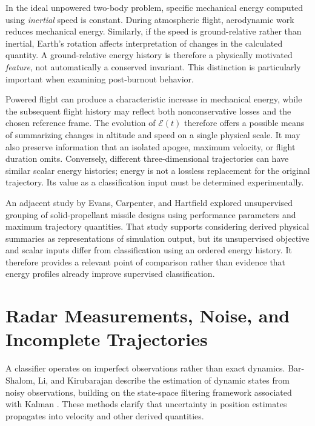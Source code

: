 In the ideal unpowered two-body problem, specific mechanical energy
computed using \emph{inertial} speed is constant. During atmospheric
flight, aerodynamic work reduces mechanical energy. Similarly, if
the speed is ground-relative rather than inertial, Earth's rotation
affects interpretation of changes in the calculated quantity.
A ground-relative energy history is therefore a physically motivated
\emph{feature}, not automatically a conserved invariant. This distinction
is particularly important when examining post-burnout behavior.

Powered flight can produce a characteristic increase in mechanical
energy, while the subsequent flight history may reflect both
nonconservative losses and the chosen reference frame. The evolution
of $\mathcal{E}(t)$ therefore offers a possible means of summarizing
changes in altitude and speed on a single physical scale. It may also
preserve information that an isolated apogee, maximum velocity,
or flight duration omits. Conversely, different three-dimensional
trajectories can have similar scalar energy histories; energy is not
a lossless replacement for the original trajectory. Its value as a
classification input must be determined experimentally.

An adjacent study by Evans, Carpenter, and Hartfield
\cite{evans2026clustering} explored unsupervised grouping of
solid-propellant missile designs using performance parameters
and maximum trajectory quantities. That study supports considering
derived physical summaries as representations of simulation output,
but its unsupervised objective and scalar inputs differ from
classification using an ordered energy history. It therefore
provides a relevant point of comparison rather than evidence
that energy profiles already improve supervised classification.

\section{Radar Measurements, Noise, and Incomplete Trajectories}
\label{sec:lit-noise}

A classifier operates on imperfect observations rather than exact
dynamics. Bar-Shalom, Li, and Kirubarajan
\cite{barshalom2001estimation} describe the estimation of dynamic
states from noisy observations, building on the state-space
filtering framework associated with Kalman \cite{kalman1960filtering}.
These methods clarify that uncertainty in position estimates
propagates into velocity and other derived quantities.

